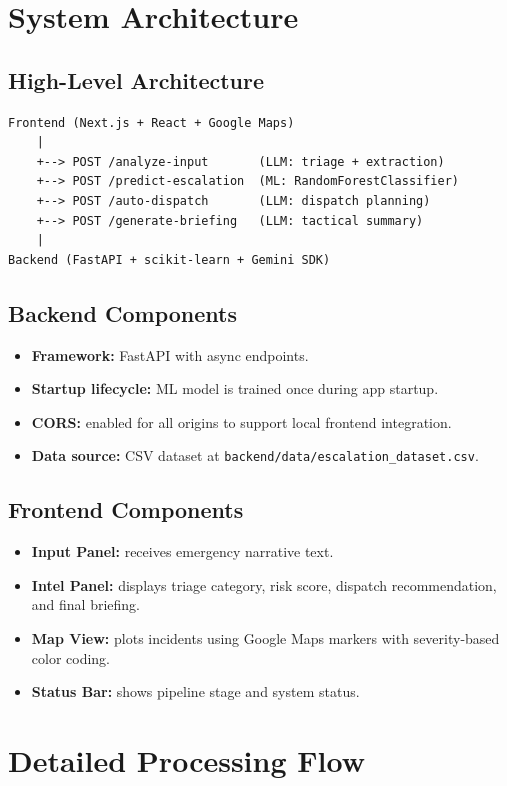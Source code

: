 \documentclass[12pt,a4paper]{article}
\begin{document}
\section{System Architecture}
\subsection{High-Level Architecture}
\begin{verbatim}
Frontend (Next.js + React + Google Maps)
    |
    +--> POST /analyze-input       (LLM: triage + extraction)
    +--> POST /predict-escalation  (ML: RandomForestClassifier)
    +--> POST /auto-dispatch       (LLM: dispatch planning)
    +--> POST /generate-briefing   (LLM: tactical summary)
    |
Backend (FastAPI + scikit-learn + Gemini SDK)
\end{verbatim}

\subsection{Backend Components}
\begin{itemize}[leftmargin=1.5em]
  \item \textbf{Framework:} FastAPI with async endpoints.
  \item \textbf{Startup lifecycle:} ML model is trained once during app startup.
  \item \textbf{CORS:} enabled for all origins to support local frontend integration.
  \item \textbf{Data source:} CSV dataset at \texttt{backend/data/escalation\_dataset.csv}.
\end{itemize}

\subsection{Frontend Components}
\begin{itemize}[leftmargin=1.5em]
  \item \textbf{Input Panel:} receives emergency narrative text.
  \item \textbf{Intel Panel:} displays triage category, risk score, dispatch recommendation, and final briefing.
  \item \textbf{Map View:} plots incidents using Google Maps markers with severity-based color coding.
  \item \textbf{Status Bar:} shows pipeline stage and system status.
\end{itemize}

\section{Detailed Processing Flow}
\end{document}
